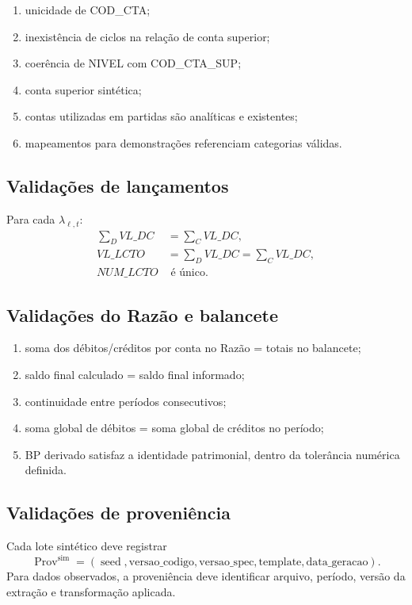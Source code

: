 \documentclass[11pt,a4paper]{article}
\newcommand{\Prov}{\operatorname{Prov}}
\newcommand{\seed}{\operatorname{seed}}
\begin{document}
\begin{enumerate}
    \item unicidade de COD\_CTA;
    \item inexistência de ciclos na relação de conta superior;
    \item coerência de NIVEL com COD\_CTA\_SUP;
    \item conta superior sintética;
    \item contas utilizadas em partidas são analíticas e existentes;
    \item mapeamentos para demonstrações referenciam categorias válidas.
\end{enumerate}

\subsection{Validações de lançamentos}

Para cada $\lambda_{\ell,t}$:
\begin{align}
\sum_D VL\_DC&=\sum_C VL\_DC,\\
VL\_LCTO&=\sum_D VL\_DC=\sum_C VL\_DC,\\
NUM\_LCTO&\text{ é único.}
\end{align}

\subsection{Validações do Razão e balancete}

\begin{enumerate}
    \item soma dos débitos/créditos por conta no Razão = totais no balancete;
    \item saldo final calculado = saldo final informado;
    \item continuidade entre períodos consecutivos;
    \item soma global de débitos = soma global de créditos no período;
    \item BP derivado satisfaz a identidade patrimonial, dentro da tolerância numérica definida.
\end{enumerate}

\subsection{Validações de proveniência}

Cada lote sintético deve registrar
\begin{equation}
\boxed{
\Prov^{\mathrm{sim}}
=(\seed,\mathrm{versao\_codigo},\mathrm{versao\_spec},\mathrm{template},\mathrm{data\_geracao}).
}
\end{equation}
Para dados observados, a proveniência deve identificar arquivo, período, versão da extração e transformação aplicada.
\end{document}
